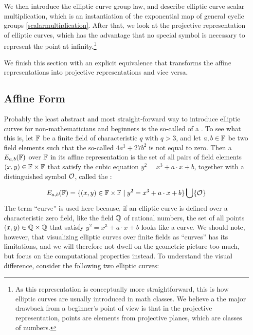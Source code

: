 We then introduce the elliptic curve group law, and describe elliptic curve scalar multiplication, which is an instantiation of the exponential map of general cyclic groups \ref{scalarmultiplication}. After that, we look at the projective representation of elliptic curves, which has the advantage that no special symbol is necessary to represent the point at infinity.\footnote{As this representation is conceptually more straightforward, this is how elliptic curves are usually introduced in math classes. We believe a the major drawback from a beginner's point of view is that in the projective representation, points are elements from projective planes, which are classes of numbers.}

We finish this section with an explicit equivalence that transforms the affine representations into projective representations and vice versa.

\subsection{Affine  Form} Probably the least abstract and most straight-forward way to introduce elliptic curves for non-mathematicians and beginners is the so-called  of a . To see what this is, let $\mathbb{F}$ be a finite field of characteristic $q$ with $q>3$, and let $a,b\in \mathbb{F}$ be two field elements such that the so-called  $4a^3+ 27b^2$ is not equal to zero. Then a  $E_{a,b}(\mathbb{F})$ over $\mathbb{F}$ in its affine representation is the set of all pairs of field elements $(x,y)\in \mathbb{F}\times \mathbb{F}$ that satisfy the  cubic equation $y^2=x^3+a\cdot x+b$, together with a distinguished symbol $\mathcal{O}$, called the :

\begin{equation}
\label{def_short_weierstrass_curve}
E_{a,b}(\mathbb{F}) = \{(x,y)\in \mathbb{F}\times \mathbb{F}\;|\; y^2=x^3+a\cdot x+b \} \bigcup \{\mathcal{O}\}
\end{equation}
The term ``curve'' is used here because, if an elliptic curve is defined over a characteristic zero field, like the field $\mathbb{Q}$ of rational numbers, the set of all points $(x,y)\in \mathbb{Q}\times \mathbb{Q}$ that satisfy $y^2 = x^3 +a\cdot x +b$ looks like a curve. We should note, however, that visualizing elliptic curves over finite fields as ``curves'' has its limitations, and we will therefore not dwell on the geometric picture too much, but focus on the computational properties instead. To understand the visual difference, consider the following two elliptic curves: 


